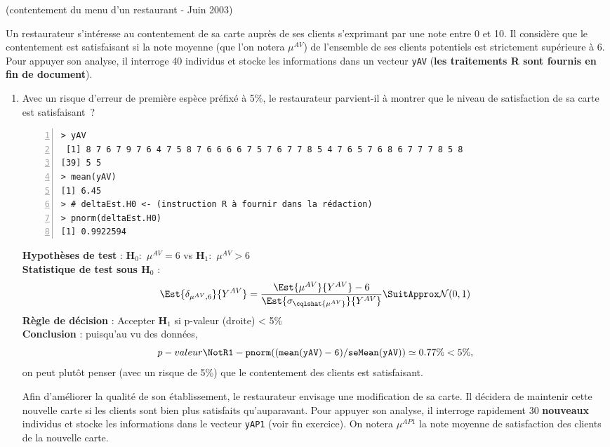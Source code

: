 \documentclass[10pt]{report}
\begin{document}
\begin{exercice} (contentement du menu d'un restaurant - Juin 2003)

Un restaurateur s'int{\'e}resse au contentement de sa carte aupr{\`e}s de ses clients s'exprimant par une note entre 0 et 10. Il consid{\`e}re que le contentement est satisfaisant si la note moyenne  (que l'on notera $\mu^{AV}$) de l'ensemble de ses clients potentiels est strictement sup{\'e}rieure {\`a} 6. Pour appuyer son analyse, il interroge 40 individus et stocke les informations dans un vecteur \texttt{yAV} (\textbf{les traitements R sont fournis en fin de document}).


\begin{enumerate}
\item Avec un risque d'erreur de premi{\`e}re esp{\`e}ce pr{\'e}fix{\'e} {\`a} 5\%, le restaurateur parvient-il {\`a} montrer que le niveau de satisfaction de sa carte est satisfaisant~?

\IndicR
\begin{Verbatim}[frame=leftline,fontfamily=tt,fontshape=n,numbers=left]
> yAV
 [1] 8 7 6 7 9 7 6 4 7 5 8 7 6 6 6 6 7 5 7 6 7 7 8 5 4 7 6 5 7 6 8 6 7 7 7 8 5 8
[39] 5 5
> mean(yAV)
[1] 6.45
> # deltaEst.H0 <- (instruction R à fournir dans la rédaction)
> pnorm(deltaEst.H0)
[1] 0.9922594
\end{Verbatim}

 

\begin{Correction}

\noindent \textbf{Hypothèses de test} : $\mathbf{H}_0:$ $\mu^{AV}=6$ vs {\large $\mathbf{H}_1:$ $\mu^{AV}>6$}\\
\textbf{Statistique de test sous $\mathbf{H}_0$} :
  $$
  \Est{\delta_{\mu^{AV},6}}{Y^{AV}}= {\displaystyle \frac{\Est{\mu^{AV}}{Y^{AV}}-6}{
\Est{\sigma_{\cqlshat{\mu^{AV}}}}{Y^{AV}}
}} 
  \SuitApprox \mathcal{N}(0,1)
  $$
\textbf{Règle de décision} : Accepter $\mathbf{H}_1$ si 
  p-valeur (droite) < 5\%\\
\noindent \textbf{Conclusion} :
puisqu'au vu des données, 
  \[
p-valeur\NotR\mathtt{1-pnorm((mean(yAV)-6)/seMean(yAV))} \simeq 0.77\% < 5\%,
\]
on peut plutôt penser (avec un risque de 5\%) que le contentement des clients est satisfaisant.
\end{Correction}


Afin d'am{\'e}liorer la qualit{\'e} de son {\'e}tablissement, le restaurateur envisage une modification de sa carte. Il d{\'e}cidera de maintenir cette nouvelle carte si les clients sont bien plus satisfaits qu'auparavant. Pour appuyer son analyse, il interroge rapidement 30 \textbf{nouveaux} individus et stocke les informations dans le vecteur \texttt{yAP1} (voir fin exercice). On notera $\mu^{AP1}$ la note moyenne de satisfaction des clients de la nouvelle carte. 


\end{enumerate}
\end{exercice}
\end{document}
